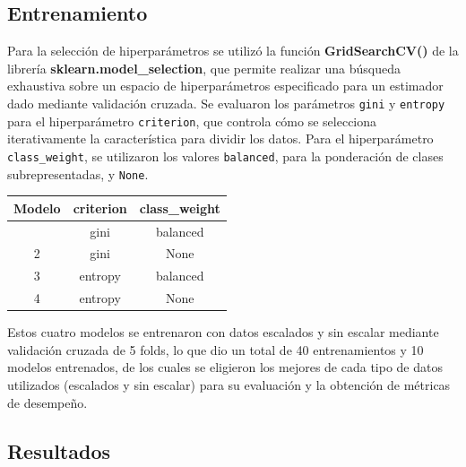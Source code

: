 \documentclass[
  10pt,
]{article}
\newcounter{none} %
\begin{document}
\subsection{Entrenamiento}\label{entrenamiento}

Para la selección de hiperparámetros se utilizó la función
\textbf{GridSearchCV()} de la librería
\textbf{sklearn.model\_selection}, que permite realizar una búsqueda
exhaustiva sobre un espacio de hiperparámetros especificado para un
estimador dado mediante validación cruzada. Se evaluaron los parámetros
\texttt{gini} y \texttt{entropy} para el hiperparámetro
\texttt{criterion}, que controla cómo se selecciona iterativamente la
característica para dividir los datos. Para el hiperparámetro
\texttt{class\_weight}, se utilizaron los valores \texttt{balanced},
para la ponderación de clases subrepresentadas, y \texttt{None}.

{\def\LTcaptype{none} %
\begin{longtable}[]{@{}ccc@{}}
\toprule\noalign{}
Modelo & criterion & class\_weight \\
\midrule\noalign{}
\endhead
\bottomrule\noalign{}
\endlastfoot
1 & gini & balanced \\
2 & gini & None \\
3 & entropy & balanced \\
4 & entropy & None \\
\end{longtable}
}

Estos cuatro modelos se entrenaron con datos escalados y sin escalar
mediante validación cruzada de 5 folds, lo que dio un total de 40
entrenamientos y 10 modelos entrenados, de los cuales se eligieron los
mejores de cada tipo de datos utilizados (escalados y sin escalar) para
su evaluación y la obtención de métricas de desempeño.

\subsection{Resultados}\label{resultados}
\end{document}
